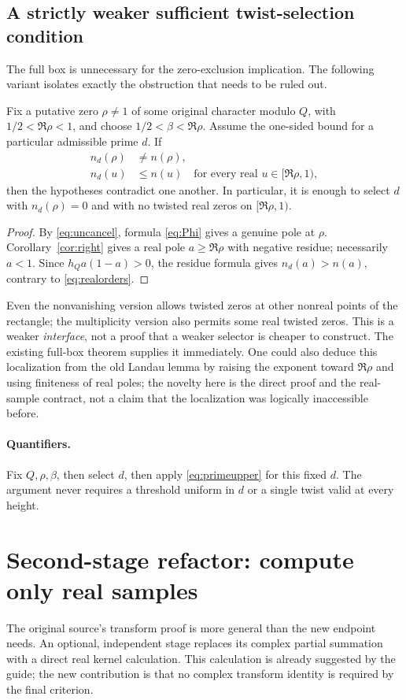 \documentclass[11pt,letterpaper]{article}
\theoremstyle{remark}\newtheorem{remark}[theorem]{Remark}
\begin{document}
\subsection{A strictly weaker sufficient twist-selection condition}\label{sec:selector}
The full box is unnecessary for the zero-exclusion implication. The following variant isolates exactly the obstruction that needs to be ruled out.
\begin{corollary}\label{cor:twist}
Fix a putative zero $\rho\ne1$ of some original character modulo $Q$, with $1/2<\Re\rho<1$, and choose $1/2<\beta<\Re\rho$. Assume the one-sided bound for a particular admissible prime $d$. If
\begin{align}
 n_d(\rho)&\ne n(\rho),\label{eq:uncancel}\\
 n_d(u)&\le n(u)\quad\text{for every real }u\in[\Re\rho,1),\label{eq:realorders}
\end{align}
then the hypotheses contradict one another. In particular, it is enough to select $d$ with $n_d(\rho)=0$ and with no twisted real zeros on $[\Re\rho,1)$.
\end{corollary}
\begin{proof}
By \eqref{eq:uncancel}, formula \eqref{eq:Phi} gives a genuine pole at $\rho$. Corollary~\ref{cor:right} gives a real pole $a\ge\Re\rho$ with negative residue; necessarily $a<1$. Since $h_Qa(1-a)>0$, the residue formula gives $n_d(a)>n(a)$, contrary to \eqref{eq:realorders}.
\end{proof}
Even the nonvanishing version allows twisted zeros at other nonreal points of the rectangle; the multiplicity version also permits some real twisted zeros. This is a weaker \emph{interface}, not a proof that a weaker selector is cheaper to construct. The existing full-box theorem supplies it immediately. One could also deduce this localization from the old Landau lemma by raising the exponent toward $\Re\rho$ and using finiteness of real poles; the novelty here is the direct proof and the real-sample contract, not a claim that the localization was logically inaccessible before.

\paragraph{Quantifiers.} Fix $Q,\rho,\beta$, then select $d$, then apply \eqref{eq:primeupper} for this fixed $d$. The argument never requires a threshold uniform in $d$ or a single twist valid at every height.

\section{Second-stage refactor: compute only real samples}
The original source's transform proof is more general than the new endpoint needs. An optional, independent stage replaces its complex partial summation with a direct real kernel calculation. This calculation is already suggested by the guide; the new contribution is that no complex transform identity is required by the final criterion.
\end{document}
